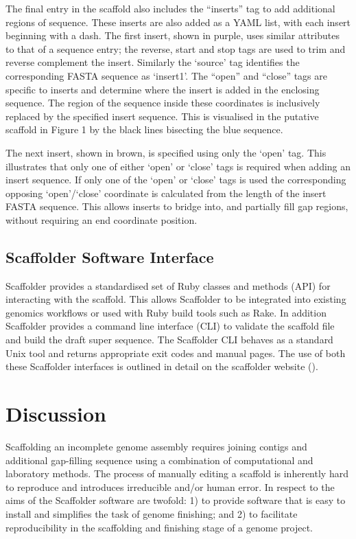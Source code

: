 \documentclass[10pt]{bmc_article}
\newenvironment{bmcformat}{\begin{raggedright}\baselineskip20pt\sloppy\setboolean{publ}{false}}{\end{raggedright}\baselineskip20pt\sloppy}
\begin{document}
\begin{bmcformat}
The final entry in the scaffold also includes the ``inserts'' tag to add
additional regions of sequence. These inserts are also added as a YAML list,
with each insert beginning with a dash. The first insert, shown in purple,
uses similar attributes to that of a sequence entry; the reverse, start and
stop tags are used to trim and reverse complement the insert. Similarly the
`source' tag identifies the corresponding FASTA sequence as `insert1'. The
``open'' and ``close'' tags are specific to inserts and determine where the
insert is added in the enclosing sequence. The region of the sequence inside
these coordinates is inclusively replaced by the specified insert sequence.
This is visualised in the putative scaffold in Figure 1 by the black lines
bisecting the blue sequence. \pb

The next insert, shown in brown, is specified using only the `open' tag. This
illustrates that only one of either `open' or `close' tags is required when
adding an insert sequence. If only one of the `open' or `close' tags is used
the corresponding opposing `open'/`close' coordinate is calculated from the
length of the insert FASTA sequence. This allows inserts to bridge into, and
partially fill gap regions, without requiring an end coordinate position. \pb

\subsection*{Scaffolder Software Interface} %

Scaffolder provides a standardised set of Ruby classes and methods (API) for
interacting with the scaffold. This allows Scaffolder to be integrated into
existing genomics workflows or used with Ruby build tools such as Rake. In
addition Scaffolder provides a command line interface (CLI) to validate the
scaffold file and build the draft super sequence. The Scaffolder CLI behaves
as a standard Unix tool and returns appropriate exit codes and manual pages.
The use of both these Scaffolder interfaces is outlined in detail on the
scaffolder website (\scaffolder).  \pb

\clearpage

\section*{Discussion} %

Scaffolding an incomplete genome assembly requires joining contigs and
additional gap-filling sequence using a combination of computational and
laboratory methods. The process of manually editing a scaffold is inherently
hard to reproduce and introduces irreducible
 and/or human error. In respect to  the aims of the Scaffolder software are twofold: 1) to provide
software that is easy to install and simplifies the task of genome finishing;
and 2) to facilitate reproducibility in the scaffolding and finishing stage of
a genome project. \pb


\end{bmcformat}
\end{document}
